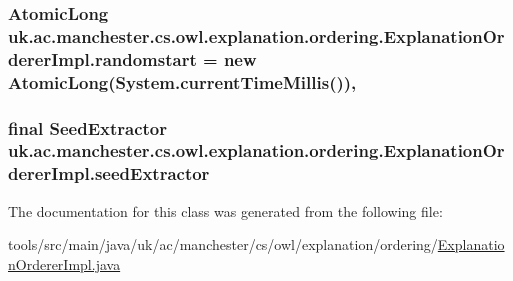 \hypertarget{classuk_1_1ac_1_1manchester_1_1cs_1_1owl_1_1explanation_1_1ordering_1_1_explanation_orderer_impl_a14a20bc03b84b7431e38e518c862b92f}{
\subsubsection[{randomstart}]{\setlength{\rightskip}{0pt plus 5cm}Atomic\-Long uk.\-ac.\-manchester.\-cs.\-owl.\-explanation.\-ordering.\-Explanation\-Orderer\-Impl.\-randomstart = new Atomic\-Long(System.\-current\-Time\-Millis())\hspace{0.3cm}{\ttfamily [static]}, {\ttfamily [private]}}}\label{classuk_1_1ac_1_1manchester_1_1cs_1_1owl_1_1explanation_1_1ordering_1_1_explanation_orderer_impl_a14a20bc03b84b7431e38e518c862b92f}
\hypertarget{classuk_1_1ac_1_1manchester_1_1cs_1_1owl_1_1explanation_1_1ordering_1_1_explanation_orderer_impl_abffbe10be5964218fa0dac101204bcc1}{
\subsubsection[{seed\-Extractor}]{\setlength{\rightskip}{0pt plus 5cm}final Seed\-Extractor uk.\-ac.\-manchester.\-cs.\-owl.\-explanation.\-ordering.\-Explanation\-Orderer\-Impl.\-seed\-Extractor\hspace{0.3cm}{\ttfamily [private]}}}\label{classuk_1_1ac_1_1manchester_1_1cs_1_1owl_1_1explanation_1_1ordering_1_1_explanation_orderer_impl_abffbe10be5964218fa0dac101204bcc1}


The documentation for this class was generated from the following file\-:\begin{DoxyCompactItemize}
\item 
tools/src/main/java/uk/ac/manchester/cs/owl/explanation/ordering/\hyperlink{_explanation_orderer_impl_8java}{Explanation\-Orderer\-Impl.\-java}\end{DoxyCompactItemize}
